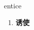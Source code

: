 
\begin{frame}
{\huge entice}
\begin{center}
\begin{enumerate}\Large
  \item \textbf{诱使}
\end{enumerate}
\end{center}
\end{frame}
